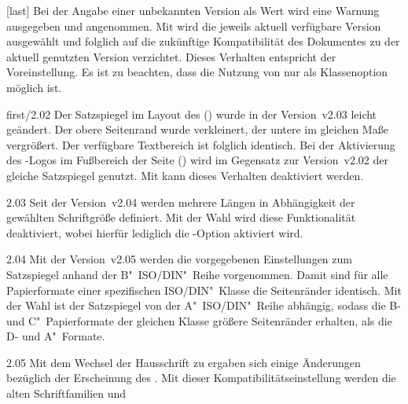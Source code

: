 \begin{Declaration*}{}
\begin{Declaration*}{}
\begin{Declaration*}{}
\begin{Declaration}[v2.03]{}[last]
Bei der Angabe einer unbekannten Version als Wert wird eine Warnung ausgegeben 
und  angenommen. Mit  wird die 
jeweils aktuell verfügbare Version ausgewählt und folglich auf die zukünftige 
Kompatibilität des Dokumentes zu der aktuell genutzten Version verzichtet. 
Dieses Verhalten entspricht der Voreinstellung. Es ist zu beachten, dass die 
Nutzung von  nur als Klassenoption möglich ist.
%
\begin{values}{}
\item[first/2.02]
  Der Satzspiegel im Layout des \CDs () wurde in 
  der Version~v2.03 leicht geändert. Der obere Seitenrand wurde verkleinert, 
  der untere im gleichen Maße vergrößert. Der verfügbare Textbereich ist 
  folglich identisch. Bei der Aktivierung des \DDC-Logos im Fußbereich der 
  Seite () wird im Gegensatz zur Version~v2.02 der 
  gleiche Satzspiegel genutzt. Mit  kann dieses 
  Verhalten deaktiviert werden.
\item[2.03]
  Seit der Version~v2.04 werden mehrere Längen in Abhängigkeit der gewählten 
  Schriftgröße definiert. Mit der Wahl  wird diese 
  Funktionalität deaktiviert, wobei hierfür lediglich die \TUDScript-Option 
   aktiviert wird. 
\item[2.04]
  Mit der Version~v2.05 werden die vorgegebenen Einstellungen zum Satzspiegel 
  anhand der B"~ISO/DIN"~Reihe vorgenommen. Damit sind für alle Papierformate 
  einer spezifischen ISO/DIN"~Klasse die Seitenränder identisch. Mit der Wahl 
   ist der Satzspiegel von der A"~ISO/DIN"~Reihe 
  abhängig, sodass die B- und C"~Papierformate der gleichen Klasse größere 
  Seitenränder erhalten, als die D- und A"~Formate.
\item[2.05]
  Mit dem Wechsel der Hausschrift zu \OpenSans ergaben sich einige Änderungen 
  bezüglich der Erscheinung des \CDs. Mit dieser Kompatibilitätseinstellung 
  werden die alten Schriftfamilien \Univers und \DIN 

\end{values}
\end{Declaration}
\end{Declaration*}
\end{Declaration*}
\end{Declaration*}
